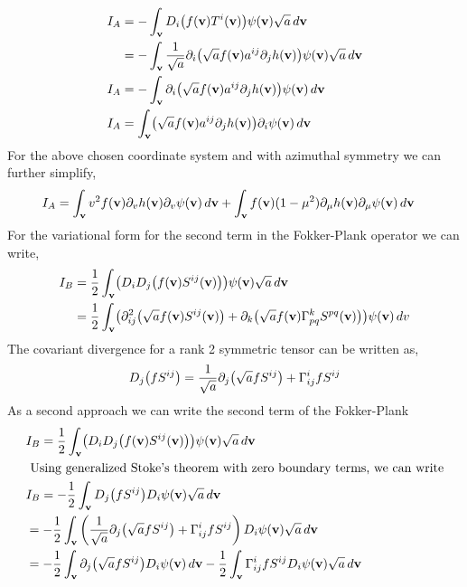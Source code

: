 \documentclass{article}[draft]
\begin{document}
\begin{align*}
	I_A &= -\int_{\vect{v}} D_i\of{f\of{\vect{v}} T^i \of{\vect{v}}} \psi\of{\vect{v}} \sqrt{a} \diff{\vect{v}}\\
		&= -\int_{\vect{v}} \frac{1}{\sqrt{a}} \partial_i\of{\sqrt{a} f\of{\vect{v}} a^{ij} \partial_j h \of{\vect{v}} } \psi\of{\vect{v}} \sqrt{a} \diff{\vect{v}}\\
	I_A &= -\int_{\vect{v}} \partial_i\of{\sqrt{a} f\of{\vect{v}} a^{ij} \partial_j h\of{\vect{v}} } \psi\of{\vect{v}} \diff{\vect{v}}\\
	I_A &= \int_{\vect{v}} \of{\sqrt{a} f\of{\vect{v}} a^{ij} \partial_j h\of{\vect{v}} } \partial_i \psi\of{\vect{v}} \diff{\vect{v}} 
\end{align*} 
For the above chosen coordinate system and with azimuthal symmetry we can further simplify, 
\begin{align*}
	I_A&= \int_{\vect{v}} v^2 f\of{\vect{v}}\partial_vh\of{\vect{v}}\partial_v \psi\of{\vect{v}}\diff{\vect{v}}  + \int_{\vect{v}} f\of{\vect{v}} (1-\mu^2) \partial_\mu h\of{\vect{v}}\partial_\mu \psi\of{\vect{v}}  \diff{\vect{v}} 
\end{align*}
For the variational form for the second term in the Fokker-Plank operator we can write, 
\begin{align*}
	I_B &= \frac{1}{2} \int_{\vect{v}} \of{D_i D_j \of{f\of{\vect{v}} S^{ij}\of{\vect{v}}}} \psi\of{\vect{v}} \sqrt{a} \diff{\vect{v}} \\
	&= \frac{1}{2} \int_{\vect{v}} 
		\of {\partial^2_{ij} \of{\sqrt{a} f\of{\vect{v}} S^{ij}\of{\vect{v}}} + \partial_k \of{\sqrt{a} f\of{\vect{v}} \Gamma^{k}_{pq} S^{pq}\of{\vect{v}} }} \psi\of{\vect{v}} \diff{v}
\end{align*}
The covariant divergence for a rank 2 symmetric tensor can be written as, 
\begin{align*}
	D_j\of{fS^{ij}} = \frac{1}{\sqrt{a}} \partial_j \of{\sqrt{a} f S^{ij} } + \Gamma^{i}_{ij} f S^{ij}
\end{align*}
As a second approach we can write the second term of the Fokker-Plank
\begin{align*}
	&I_B = \frac{1}{2} \int_{\vect{v}} \of{D_i D_j \of{f\of{\vect{v}} S^{ij}\of{\vect{v}}}} \psi\of{\vect{v}} \sqrt{a} \diff{\vect{v}} \\
	&\text{ Using generalized Stoke's theorem with zero boundary terms, we can write}\\
	&I_B = -\frac{1}{2} \int_{\vect{v}} D_j\of{f S^{ij}} D_i \psi\of{\vect{v}} \sqrt{a} \diff{\vect{v}} \\
	& = -\frac{1}{2} \int_{\vect{v}} \left( \frac{1}{\sqrt{a}} \partial_j \of{\sqrt{a} f S^{ij} } + \Gamma^{i}_{ij} f S^{ij} \right) D_i \psi\of{\vect{v}} \sqrt{a} \diff{\vect{v}}\\
	& = -\frac{1}{2} \int_{\vect{v}} \partial_j \of{\sqrt{a} f S^{ij}} D_i \psi\of{\vect{v}} \diff{\vect{v}} -\frac{1}{2} \int_{\vect{v}} \Gamma^{i}_{ij} f S^{ij}  D_i \psi\of{\vect{v}} \sqrt{a} \diff{\vect{v}}
\end{align*}
\end{document}

